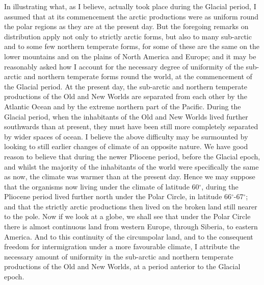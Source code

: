 \indent In illustrating what, as I believe, actually took place during the Glacial period, I assumed that at its commencement the arctic productions were as uniform round the polar regions as they are at the present day. But the foregoing remarks on distribution apply not only to strictly arctic forms, but also to many sub-arctic and to some few northern temperate forms, for some of these are the same on the lower mountains and on the plains of North America and Europe; and it may be reasonably asked how I account for the necessary degree of uniformity of the sub-arctic and northern temperate forms round the world, at the commencement of the Glacial period. At the present day, the sub-arctic and northern temperate productions of the Old and New Worlds are separated from each other by the Atlantic Ocean and by the extreme northern part of the Pacific. During the Glacial period, when the inhabitants of the Old and New Worlds lived further southwards than at present, they must have been still more completely separated by wider spaces of ocean. I believe the above difficulty may be surmounted by looking to still earlier changes of climate of an opposite nature. We have good reason to believe that during the newer Pliocene period, before the Glacial epoch, and whilst the majority of the inhabitants of the world were specifically the same as now, the climate was warmer than at the present day. Hence we may suppose that the organisms now living under the climate of latitude 60$^{\circ}$, during the Pliocene period lived further north under the Polar Circle, in latitude 66$^{\circ}$-67$^{\circ}$; and that the strictly arctic productions then lived on the broken land still nearer to the pole. Now if we look at a globe, we shall see that under the Polar Circle there is almost continuous land from western Europe, through Siberia, to eastern America. And to this continuity of the circumpolar land, and to the consequent freedom for intermigration under a more favourable climate, I attribute the necessary amount of uniformity in the sub-arctic and northern temperate productions of the Old and New Worlds, at a period anterior to the Glacial epoch.~\\
